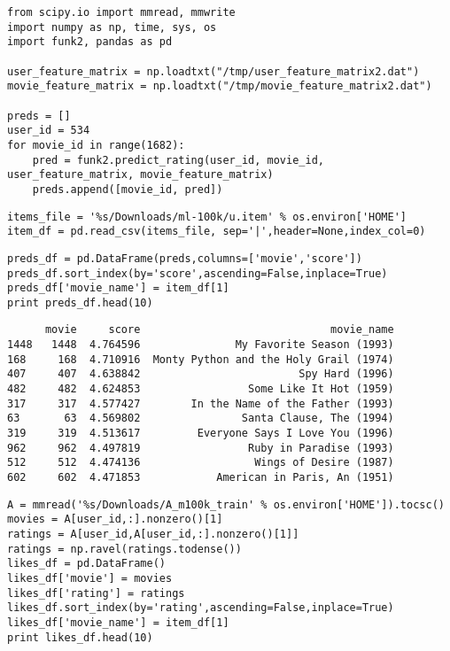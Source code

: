 \documentclass[12pt,fleqn]{article}\usepackage{../common}
\begin{document}
\begin{verbatim}
from scipy.io import mmread, mmwrite
import numpy as np, time, sys, os
import funk2, pandas as pd

user_feature_matrix = np.loadtxt("/tmp/user_feature_matrix2.dat")
movie_feature_matrix = np.loadtxt("/tmp/movie_feature_matrix2.dat")

preds = []
user_id = 534
for movie_id in range(1682):
    pred = funk2.predict_rating(user_id, movie_id, user_feature_matrix, movie_feature_matrix)
    preds.append([movie_id, pred])
\end{verbatim}

\begin{verbatim}
items_file = '%s/Downloads/ml-100k/u.item' % os.environ['HOME']
item_df = pd.read_csv(items_file, sep='|',header=None,index_col=0)
\end{verbatim}

\begin{verbatim}
preds_df = pd.DataFrame(preds,columns=['movie','score'])
preds_df.sort_index(by='score',ascending=False,inplace=True)
preds_df['movie_name'] = item_df[1]
print preds_df.head(10)
\end{verbatim}

\begin{verbatim}
      movie     score                              movie_name
1448   1448  4.764596               My Favorite Season (1993)
168     168  4.710916  Monty Python and the Holy Grail (1974)
407     407  4.638842                         Spy Hard (1996)
482     482  4.624853                 Some Like It Hot (1959)
317     317  4.577427        In the Name of the Father (1993)
63       63  4.569802                Santa Clause, The (1994)
319     319  4.513617         Everyone Says I Love You (1996)
962     962  4.497819                 Ruby in Paradise (1993)
512     512  4.474136                  Wings of Desire (1987)
602     602  4.471853            American in Paris, An (1951)
\end{verbatim}

\begin{verbatim}
A = mmread('%s/Downloads/A_m100k_train' % os.environ['HOME']).tocsc()
movies = A[user_id,:].nonzero()[1]
ratings = A[user_id,A[user_id,:].nonzero()[1]]
ratings = np.ravel(ratings.todense())
likes_df = pd.DataFrame()
likes_df['movie'] = movies
likes_df['rating'] = ratings
likes_df.sort_index(by='rating',ascending=False,inplace=True)
likes_df['movie_name'] = item_df[1]
print likes_df.head(10)
\end{verbatim}
\end{document}
